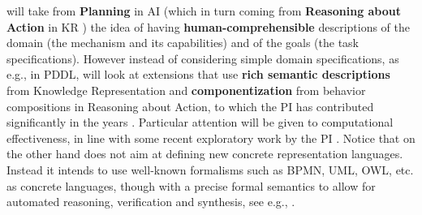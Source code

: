 \project will take from \textbf{Planning} in AI \cite{GeffnerBo13} (which in turn
coming from \textbf{Reasoning about Action} in KR \cite{Reiter01}) the idea of having
\textbf{human-comprehensible} descriptions of the domain (the mechanism and its
capabilities) and of the goals (the task specifications). 
However
instead of considering simple domain specifications, as e.g., in PDDL, \project
will look at extensions that use \textbf{rich semantic descriptions} from
Knowledge Representation and \textbf{componentization} from behavior
compositions in Reasoning about Action,
to which the PI has contributed significantly in the
years
\cite{DeGiacomoRS98,DeGiacomoLL00,DeGiacomoLS01,SardinaGLL04,SardinaG09,DeGiacomoLP10,DeGiacomoLM12,DeGiacomoLPV14,DeGiacomoLPV16,BanihashemiGL17}. 
Particular attention will be given to computational effectiveness, in
line with some recent exploratory work by the PI
\cite{DeGLP16,DeGiacomoLPS16,CDMP17}.  
Notice that on the other hand \project does not aim at defining new
concrete representation languages. Instead it intends to use
well-known formalisms such as BPMN, UML, OWL, etc. as concrete
languages, though with a precise formal semantics to allow for
automated reasoning, verification and synthesis, see e.g.,
\cite{BerardiCG05,DeGiacomoOET17}.

